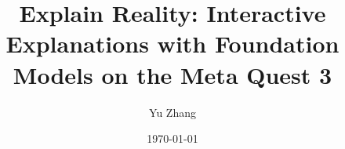 \documentclass[12pt,a4paper,bibliography=totoc,numbers=noenddot]{scrreprt}
\author{Yu Zhang}
\title{Explain Reality: Interactive Explanations with Foundation Models on the Meta Quest 3}
\date{\today}
\begin{document}





\tableofcontents
\listoffigures
\listoftables

\cleardoublepage
{}










\cleardoublepage
\renewcommand{\bibname}{References}




\end{document}
